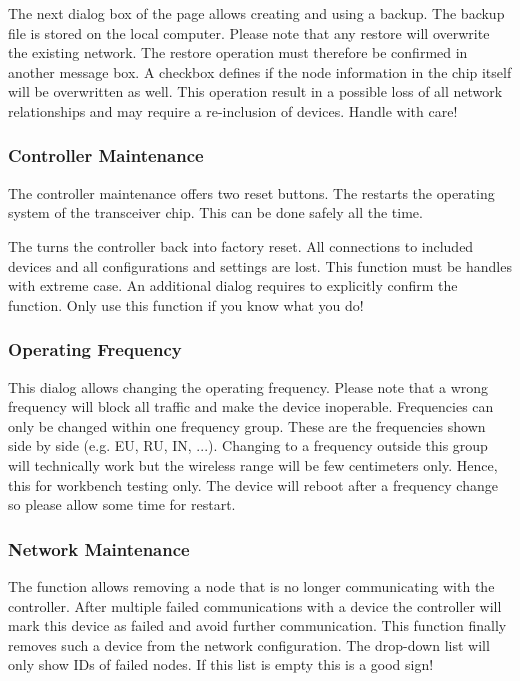 The next dialog  box of the page allows creating and using a backup.  The backup file is 
stored on the local computer. Please note that any restore will overwrite the existing 
network. The restore operation must therefore be confirmed in another message box. A 
checkbox defines if the node information in the \zwave chip itself will be overwritten 
as well. This operation result in a possible loss of all network relationships and may 
require a re-inclusion of devices. Handle with care!

\subsubsection{Controller Maintenance}

The controller maintenance offers two reset buttons. The  restarts 
the operating system of the \zwave transceiver chip. This can be done safely all the time.

The  turns the controller back into factory reset. All connections 
to included devices and all configurations and settings are lost. This function must be 
handles with extreme case. An additional dialog requires to explicitly confirm the 
function. Only use this function if you know what you do!

\subsubsection{Operating Frequency}


This dialog allows changing the operating frequency. Please note that a wrong frequency 
will block all \zwave traffic and make the device inoperable.  Frequencies can only be 
changed within one frequency group. These are the frequencies shown side by side (e.g. 
EU, RU, IN, ...). Changing to a frequency outside this group will technically work but 
the wireless range will be few centimeters only. Hence, this for workbench testing only. 
The device will reboot after a frequency change so please allow some time for restart.

\subsubsection{Network Maintenance}

The function  allows removing a node that is no longer communicating 
with the controller. After multiple failed communications with a device the controller 
will mark this device as failed and avoid further communication. This function finally 
removes such a device from the network configuration. The drop-down list will only show 
IDs of failed nodes. If this list is empty this is a good sign!

